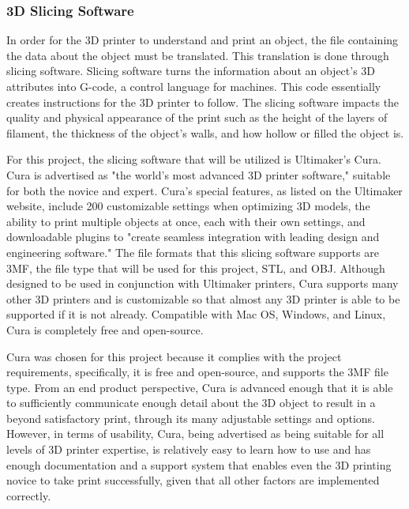 \documentclass[letterpaper, onecolumn, draftclsnofoot, 10pt, compsoc]{IEEEtran}
\begin{document}
\begin{singlespace}
        \subsubsection{3D Slicing Software}
	In order for the 3D printer to understand and print an object, the file containing the data about the object must be translated.
	This translation is done through slicing software.
	Slicing software turns the information about an object's 3D attributes into G-code, a control language for machines. 
	This code essentially creates instructions for the 3D printer to follow. \cite{whatisweb} 
    The slicing software impacts the quality and physical appearance of the print such as the height of the layers of filament, the thickness of the object's walls, and how hollow or filled the object is. \par
	For this project, the slicing software that will be utilized is Ultimaker’s Cura.
	Cura is advertised as "the world's most advanced 3D printer software," suitable for both the novice and expert. 
	Cura's special features, as listed on the Ultimaker website, include 200 customizable settings when optimizing 3D models, the ability to print multiple objects at once, each with their own settings, and downloadable plugins to "create seamless integration with leading design and engineering software." \cite{curaweb}
	The file formats that this slicing software supports are 3MF, the file type that will be used for this project, STL, and OBJ. 
	Although designed to be used in conjunction with Ultimaker printers, Cura supports many other 3D printers and is customizable so that almost any 3D printer is able to be supported if it is not already.
	Compatible with Mac OS, Windows, and Linux, Cura is completely free and open-source. \cite{curaweb} \par
    Cura was chosen for this project because it complies with the project requirements, specifically, it is free and open-source, and supports the 3MF file type. 
    From an end product perspective, Cura is advanced enough that it is able to sufficiently communicate enough detail about the 3D object to result in a beyond satisfactory print, through its many adjustable settings and options.
    However, in terms of usability, Cura, being advertised as being suitable for all levels of 3D printer expertise, is relatively easy to learn how to use and has enough documentation and a support system that enables even the 3D printing novice to take print successfully, given that all other factors are implemented correctly.
    

\end{singlespace}
\end{document}
